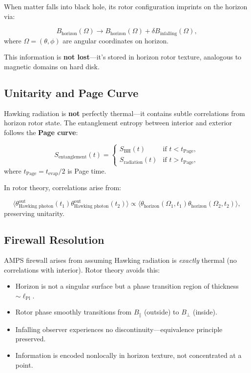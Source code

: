 \documentclass[11pt,a4paper]{article}
\numberwithin{equation}{section}
\theoremstyle{plain}
\theoremstyle{definition}
\theoremstyle{remark}
\begin{document}
When matter falls into black hole, its rotor configuration imprints on the horizon via:

\begin{equation}
B_{\text{horizon}}(\Omega) \to B_{\text{horizon}}(\Omega) + \delta B_{\text{infalling}}(\Omega),
\end{equation}
where $\Omega = (\theta, \phi)$ are angular coordinates on horizon.

This information is \textbf{not lost}—it's stored in horizon rotor texture, analogous to magnetic domains on hard disk.

\subsection{Unitarity and Page Curve}

Hawking radiation is \textbf{not} perfectly thermal—it contains subtle correlations from horizon rotor state. The entanglement entropy between interior and exterior follows the \textbf{Page curve}:

\begin{equation}
S_{\text{entanglement}}(t) = \begin{cases}
S_{\text{BH}}(t) & \text{if } t < t_{\text{Page}},\\
S_{\text{radiation}}(t) & \text{if } t > t_{\text{Page}},
\end{cases}
\end{equation}
where $t_{\text{Page}} = t_{\text{evap}}/2$ is Page time.

In rotor theory, correlations arise from:

\begin{equation}
\langle \theta_{\text{Hawking photon}}^{\text{out}}(t_1) \theta_{\text{Hawking photon}}^{\text{out}}(t_2) \rangle \propto \langle \theta_{\text{horizon}}(\Omega_1, t_1) \theta_{\text{horizon}}(\Omega_2, t_2) \rangle,
\end{equation}
preserving unitarity.

\subsection{Firewall Resolution}

AMPS firewall arises from assuming Hawking radiation is \emph{exactly} thermal (no correlations with interior). Rotor theory avoids this:

\begin{itemize}
\item Horizon is not a singular surface but a phase transition region of thickness $\sim \ell_{\text{Pl}}$.
\item Rotor phase smoothly transitions from $B_\parallel$ (outside) to $B_\perp$ (inside).
\item Infalling observer experiences no discontinuity—equivalence principle preserved.
\item Information is encoded nonlocally in horizon texture, not concentrated at a point.
\end{itemize}
\end{document}
